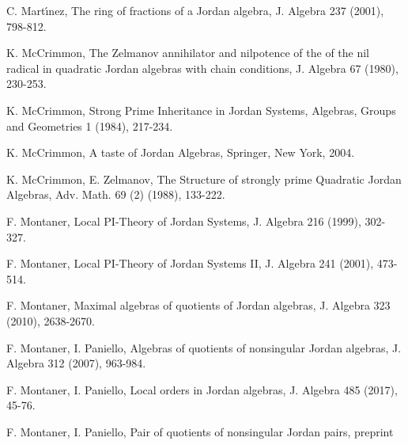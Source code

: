 \documentclass[a4paper,twoside,11pt]{article}
\theoremstyle{plain}
\theoremstyle{miestilo}
\theoremstyle{misnotas}
\begin{document}
\begin{thebibliography}{11111111}

   C. Mart{\'\i}nez,  The ring of fractions of a Jordan algebra,
  J. Algebra  237
 (2001), 798-812.


  K. McCrimmon, The Zelmanov annihilator and nilpotence of the of the nil radical in quadratic Jordan algebras with chain conditions, J. Algebra 67 (1980), 230-253.

  K. McCrimmon, Strong Prime Inheritance in Jordan Systems,  Algebras, Groups and Geometries  1
  (1984), 217-234.

  K. McCrimmon, A taste of Jordan Algebras, Springer, New York, 2004.


   K. McCrimmon, E. Zelmanov, The Structure of strongly prime Quadratic Jordan Algebras,
  Adv. Math.  69  (2)
 (1988), 133-222.



   F. Montaner, Local PI-Theory of Jordan Systems,
  J. Algebra  216
 (1999), 302-327.

   F. Montaner, Local PI-Theory of Jordan Systems II,
 J. Algebra  241
 (2001), 473-514.


    F. Montaner, Maximal algebras of quotients
 of Jordan algebras, J. Algebra
 323
 (2010), 2638-2670.

    F. Montaner, I. Paniello, Algebras of
 quotients of nonsingular Jordan algebras,   J. Algebra
 312
 (2007), 963-984.

 F. Montaner, I. Paniello, Local  orders in Jordan algebras, J. Algebra 485 (2017), 45-76.


 F. Montaner, I. Paniello, Pair of quotients of nonsingular Jordan pairs, preprint






\end{thebibliography}
\end{document}

